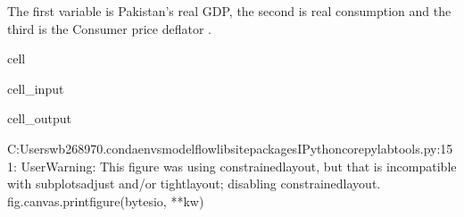 \documentclass[letterpaper,10pt,english]{jupyterBook}
\begin{document}
\sphinxAtStartPar
The first variable  is Pakistan’s real GDP, the second  is real consumption and the third is the Consumer price deflator .

\begin{sphinxuseclass}{cell}\begin{sphinxVerbatimInput}

\begin{sphinxuseclass}{cell_input}
\begin{sphinxVerbatim}[commandchars=\\\{\}]
\PYG{p}{[}\PYG{p}{]}
\end{sphinxVerbatim}

\end{sphinxuseclass}\end{sphinxVerbatimInput}
\begin{sphinxVerbatimOutput}

\begin{sphinxuseclass}{cell_output}
\begin{sphinxVerbatim}[commandchars=\\\{\}]
C:\PYGZbs{}Users\PYGZbs{}wb268970\PYGZbs{}.conda\PYGZbs{}envs\PYGZbs{}modelflow\PYGZbs{}lib\PYGZbs{}site\PYGZhy{}packages\PYGZbs{}IPython\PYGZbs{}core\PYGZbs{}pylabtools.py:151: UserWarning: This figure was using constrained\PYGZus{}layout, but that is incompatible with subplots\PYGZus{}adjust and/or tight\PYGZus{}layout; disabling constrained\PYGZus{}layout.
  fig.canvas.print\PYGZus{}figure(bytes\PYGZus{}io, **kw)
\end{sphinxVerbatim}

\noindent{}

\end{sphinxuseclass}\end{sphinxVerbatimOutput}

\end{sphinxuseclass}
\end{document}
